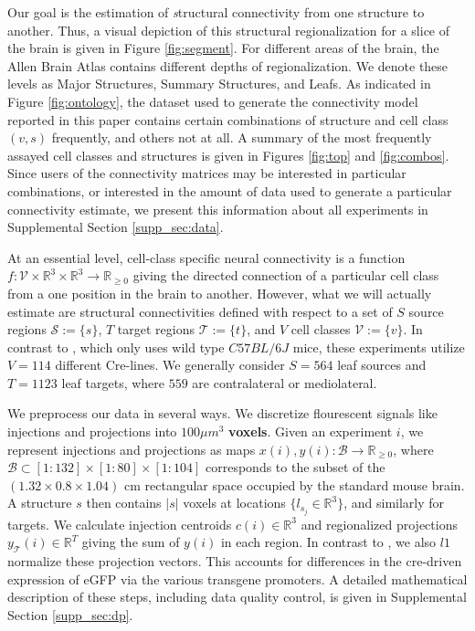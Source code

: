 Our goal is the estimation of {\textit structural connectivity} from one structure to another.
Thus, a visual depiction of this structural regionalization for a slice of the brain is given in Figure \ref{fig:segment}.
For different areas of the brain, the Allen Brain Atlas contains different depths of regionalization.
We denote these levels as Major Structures, Summary Structures, and Leafs.
As indicated in Figure \ref{fig:ontology}, the dataset used to generate the connectivity model reported in this paper contains certain combinations of structure and cell class $(v,s)$ frequently, and others not at all.
A summary of the most frequently assayed cell classes and structures is given in Figures \ref{fig:top} and \ref{fig:combos}.
Since users of the connectivity matrices may be interested in particular combinations, or interested in the amount of data used to generate a particular connectivity estimate, we present this information about all experiments in Supplemental Section \ref*{supp_sec:data}.

At an essential level, cell-class specific neural connectivity is a function $f:  \mathcal V \times \mathbb R^3 \times \mathbb R^3 \to \mathbb R_{\geq 0}$ giving the directed connection of a particular cell class from a one position in the brain to another.
However, what we will actually estimate are structural connectivities defined with respect to a set of $S$ source regions $\mathcal S := \{ s\} $, $T$ target regions $\mathcal T := \{ t \}$, and $V$ cell classes $\mathcal V := \{v\}$.
In contrast to \citet{Knox2019-ot}, which only uses wild type $C57BL/6J$ mice, these experiments utilize $V = 114$ different Cre-lines. 
We generally consider $S = 564$ leaf sources and $T = 1123$ leaf targets, where $559$ are contralateral or mediolateral.

We preprocess our data in several ways.
We discretize flourescent signals like injections and projections into $100 \mu m^3$ \textbf{voxels}.
Given an experiment $i$, we represent injections and projections as maps $x(i),y(i) : \mathcal B \to \mathbb R_{\geq 0}$, where $\mathcal B \subset [1:132] \times [1:80] \times [1:104]$ corresponds to the subset of the $(1.32 \times 0.8 \times 1.04)$ cm rectangular space occupied by the standard mouse brain.
A structure $s$ then contains $|s|$ voxels at locations $\{l_{s_j} \in \mathbb R^3\}$, and similarly for targets.
We calculate injection centroids $c(i) \in \mathbb R^3$ and regionalized projections $y_{\mathcal T} (i) \in \mathbb R^{T} $ giving the sum of $y(i)$ in each region.
In contrast to \citet{Knox2019-ot}, we also $l1$ normalize these projection vectors.
This accounts for differences in the cre-driven expression of eGFP via the various transgene promoters.
A detailed mathematical description of these steps, including data quality control, is given in Supplemental Section \ref{supp_sec:dp}.

